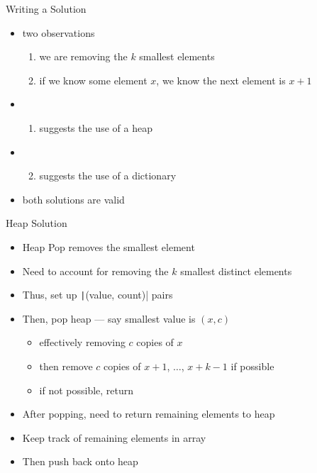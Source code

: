 \begin{frame}{Writing a Solution}
    \pause
    \begin{itemize}[<+->]
        \item two observations
              \begin{enumerate}[<+->]
                  \item we are removing the $k$ smallest elements
                  \item if we know some element $x$, we know the next element is $x + 1$
              \end{enumerate}
        \item \begin{enumerate}\item suggests the use of a heap\end{enumerate}
        \item \begin{enumerate}\setcounter{enumi}{1}\item suggests the use of a dictionary\end{enumerate}
        \item both solutions are valid
    \end{itemize}
\end{frame}

\begin{frame}{Heap Solution}
    \pause
    \begin{itemize}[<+->]
        \item Heap Pop removes the smallest element
        \item Need to account for removing the $k$ smallest \alert{distinct} elements
        \item Thus, set up \texttt|(value, count)| pairs
        \item Then, pop heap --- say smallest value is $(x, c)$
              \begin{itemize}[<+->]
                  \item effectively removing $c$ copies of $x$
                  \item then remove $c$ copies of $x + 1$, $\dots$, $x + k - 1$ if possible
                  \item if not possible, return \PyFalse
              \end{itemize}
        \item After popping, need to return remaining elements to heap
        \item Keep track of remaining elements in array
        \item Then push back onto heap
    \end{itemize}
\end{frame}

